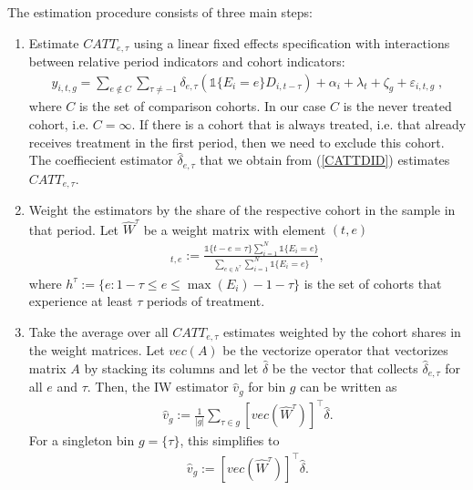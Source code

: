 The estimation procedure consists of three main steps:
\begin{enumerate}
	\item Estimate $CATT_{e, \tau}$ using a linear fixed effects specification with interactions between relative period indicators and cohort indicators:
	\begin{align} \label{CATTDID}
		y_{i, t, g} = \sum_{e \notin C}^{}\sum_{\tau \neq -1}^{} \delta_{e, \tau} (\mathds{1}\{E_i = e\} D_{i, t-\tau}) + \alpha_i + \lambda_t + \zeta_g + \varepsilon_{i, t, g} \;,
	\end{align}
	where $C$ is the set of comparison cohorts. In our case $C$ is the never treated cohort, i.e. $C = {\infty}$. If there is a cohort that is always treated, i.e. that already receives treatment in the first period, then we need to exclude this cohort. The coeffiecient estimator $\widehat{\delta}_{e, \tau}$ that we obtain from (\ref{CATTDID}) estimates $CATT_{e, \tau}$.
	
	\item Weight the estimators by the share of the respective cohort in the sample in that period. Let $\hat{W}^\tau$ be a weight matrix with element $(t, e)$
	\begin{align*}
		[\widehat{W}^\tau]_{t, e} := \frac{\mathds{1}\{t - e = \tau\} \sum_{i = 1}^{N} \mathds{1}\{E_i = e\}}{\sum_{e \in h^{\tau}} \sum_{i = 1}^{N} \mathds{1}\{E_i = e\}},
	\end{align*}
	where $h^{\tau} := \{e: 1 - \tau \leq e \leq \max(E_i) - 1 - \tau\}$ is the set of cohorts that experience at least $\tau$ periods of treatment.
	
	\item Take the average over all $CATT_{e, \tau}$ estimates weighted by the cohort shares in the weight matrices. Let $vec(A)$ be the vectorize operator that vectorizes matrix $A$ by stacking its columns and let $\widehat{\delta}$ be the vector that collects $\widehat{\delta}_{e, \tau}$ for all $e$ and $\tau$. Then, the IW estimator $\widehat{v}_g$ for bin $g$ can be written as 
	\begin{align}
		\widehat{v}_g := \frac{1}{|g|} \sum_{\tau \in g} [vec(\widehat{W}^\tau)]^\intercal \widehat{\delta}.
	\end{align}
	For a singleton bin $g = \{\tau\}$, this simplifies to
	\begin{align*}
		\widehat{v}_{g} := [vec(\widehat{W}^\tau)]^\intercal \widehat{\delta}.
	\end{align*}
	
\end{enumerate}

